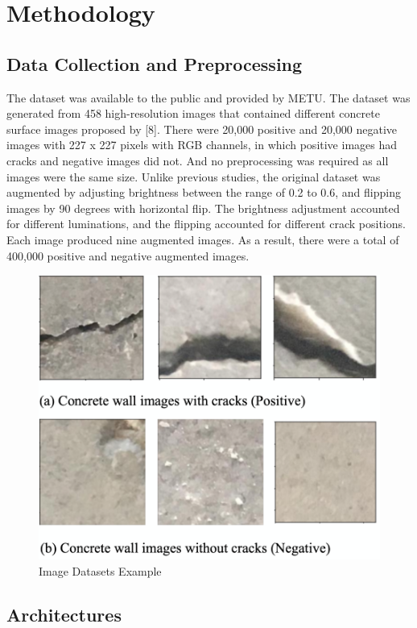 \documentclass[conference]{IEEEtran}
\begin{document}
\section{Methodology}
\subsection{Data Collection and Preprocessing}
The dataset was available to the public and provided by METU. The dataset was generated from 458 high-resolution images that contained different concrete surface images proposed by [8]. There were 20,000 positive and 20,000 negative images with 227 x 227 pixels with RGB channels, in which positive images had cracks and negative images did not. And no preprocessing was required as all images were the same size. 
Unlike previous studies, the original dataset was augmented by adjusting brightness between the range of 0.2 to 0.6, and flipping images by 90 degrees with horizontal flip. The brightness adjustment accounted for different luminations, and the flipping accounted for different crack positions. Each image produced nine augmented images. As a result, there were a total of 400,000 positive and negative augmented images. 
\begin{figure}[htbp]
\centerline{\includegraphics[scale=0.45]{Fig1_image_example.png}}
\caption{Image Datasets Example}
\label{table}
\end{figure}
\subsection{Architectures}
\end{document}
